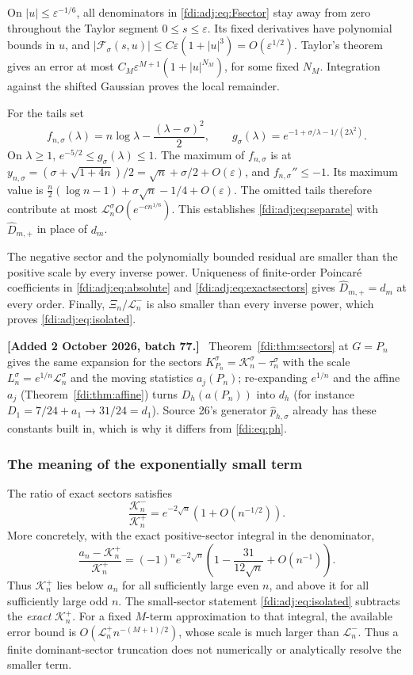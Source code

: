 \documentclass[11pt,letterpaper]{article}
\theoremstyle{remark}\newtheorem{remark}[theorem]{Remark}
\newcommand{\eps}{\varepsilon}\newcommand{\Pois}{\operatorname{Poisson}}
\newenvironment{mergenote}[1][2 October 2026, batch 77]{\par\smallskip\begingroup\small\noindent\textbf{[Added #1.]}\ }{\endgroup\par\smallskip}
\begin{document}
On $|u|\le\eps^{-1/6}$, all denominators in \eqref{fdi:adj:eq:Fsector} stay away from zero throughout the Taylor segment $0\le s\le\eps$. Its fixed derivatives have polynomial bounds in $u$, and
$|\mathcal F_\sigma(s,u)|\le C\eps(1+|u|^3)=O(\eps^{1/2})$. Taylor's theorem gives an error at most $C_M\eps^{M+1}(1+|u|^{N_M})$, for some fixed $N_M$. Integration against the shifted Gaussian proves the local remainder.

For the tails set
\[
 f_{n,\sigma}(\lambda)=n\log\lambda-\frac{(\lambda-\sigma)^2}{2},
 \qquad g_\sigma(\lambda)=e^{-1+\sigma/\lambda-1/(2\lambda^2)}.
\]
On $\lambda\ge1$, $e^{-5/2}\le g_\sigma(\lambda)\le1$. The maximum of $f_{n,\sigma}$ is at
$y_{n,\sigma}=(\sigma+\sqrt{1+4n})/2=\sqrt n+\sigma/2+O(\eps)$, and $f_{n,\sigma}''\le-1$. Its maximum value is
$\frac n2(\log n-1)+\sigma\sqrt n-1/4+O(\eps)$.
The omitted tails therefore contribute at most
$\mathcal L_n^\sigma O(e^{-cn^{1/6}})$. This establishes \eqref{fdi:adj:eq:separate} with $\widehat D_{m,+}$ in place of $d_m$.

The negative sector and the polynomially bounded residual are smaller than the positive scale by every inverse power. Uniqueness of finite-order Poincar\'e coefficients in \eqref{fdi:adj:eq:absolute} and \eqref{fdi:adj:eq:exactsectors} gives $\widehat D_{m,+}=d_m$ at every order. Finally, $\Xi_n/\mathcal L_n^-$ is also smaller than every inverse power, which proves \eqref{fdi:adj:eq:isolated}.

\begin{mergenote}
Theorem~\ref{fdi:thm:sectors} at $G=P_n$ gives the same expansion for the sectors $K^\sigma_{P_n}=\mathcal K_n^\sigma-\tau_n^\sigma$ with the scale $L_n^\sigma=e^{1/n}\mathcal L_n^\sigma$ and the moving statistics $a_j(P_n)$; re-expanding $e^{1/n}$ and the affine $a_j$ (Theorem~\ref{fdi:thm:affine}) turns $D_h(a(P_n))$ into $d_h$ (for instance $D_1=7/24+a_1\to31/24=d_1$). Source 26's generator $\widehat p_{h,\sigma}$ already has these constants built in, which is why it differs from \eqref{fdi:eq:ph}.
\end{mergenote}

\subsubsection*{The meaning of the exponentially small term}
The ratio of exact sectors satisfies
\[
 \frac{\mathcal K_n^-}{\mathcal K_n^+}=e^{-2\sqrt n}(1+O(n^{-1/2})).
\]
More concretely, with the exact positive-sector integral in the denominator,
\[
 \frac{a_n-\mathcal K_n^+}{\mathcal K_n^+}=(-1)^n e^{-2\sqrt n}
 \left(1-\frac{31}{12\sqrt n}+O(n^{-1})\right).
\]
Thus $\mathcal K_n^+$ lies below $a_n$ for all sufficiently large even $n$, and above it for all sufficiently large odd $n$.
The small-sector statement \eqref{fdi:adj:eq:isolated} subtracts the \emph{exact} $\mathcal K_n^+$. For a fixed $M$-term approximation to that integral, the available error bound is
$O(\mathcal L_n^+n^{-(M+1)/2})$, whose scale is much larger than $\mathcal L_n^-$. Thus a finite dominant-sector truncation does not numerically or analytically resolve the smaller term.
\end{document}
